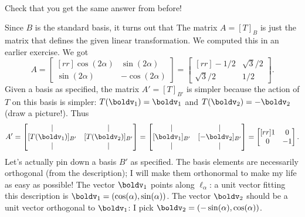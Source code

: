 \\
Check that you get the same answer from before! 
\\
\begin{solution} 
\noindent 
Since $B$ is the standard basis, it turns out that The matrix $A=[T]_B$ is just the matrix that defines the given linear transformation. We computed this in an earlier exercise. We got
\[
A=\begin{bmatrix}[rr]
\cos(2\alpha)&\sin(2\alpha)\\
\sin(2\alpha)&-\cos(2\alpha)
\end{bmatrix}=\begin{bmatrix}[rr]
-1/2&\sqrt{3}/2\\
\sqrt{3}/2&1/2
\end{bmatrix}.
\]
Given a basis as specified, the matrix $A'=[T]_{B'}$ is simpler because the action of $T$ on this basis is simpler: $T(\boldv_1)=\boldv_1$ and $T(\boldv_2)=-\boldv_2$ (draw a picture!). Thus 
\[
A'=\begin{bmatrix}
\vert&\vert\\
[T(\boldv_1)]_{B'}&[T(\boldv_2)]_{B'}\\
\vert&\vert
\end{bmatrix}
=\begin{bmatrix}
\vert&\vert\\
[\boldv_1]_{B'}&[-\boldv_2]_{B'}\\
\vert&\vert
\end{bmatrix}=
\begin{bmatrix}[rr]
1&0\\
0&-1
\end{bmatrix}.
\]
Let's actually pin down a basis $B'$ as specified. The basis elements are necessarily orthogonal (from the description); I will make them orthonormal to make my life as easy as possible!  The vector $\boldv_1$ points along $\ell_{\alpha}$: a unit vector fitting this description is $\boldv_1=(\cos(\alpha), \sin(\alpha))$. The vector $\boldv_2$ should be a unit vector orthogonal to $\boldv_1$: I pick $\boldv_2=(-\sin(\alpha), \cos(\alpha))$. 


\end{solution}
